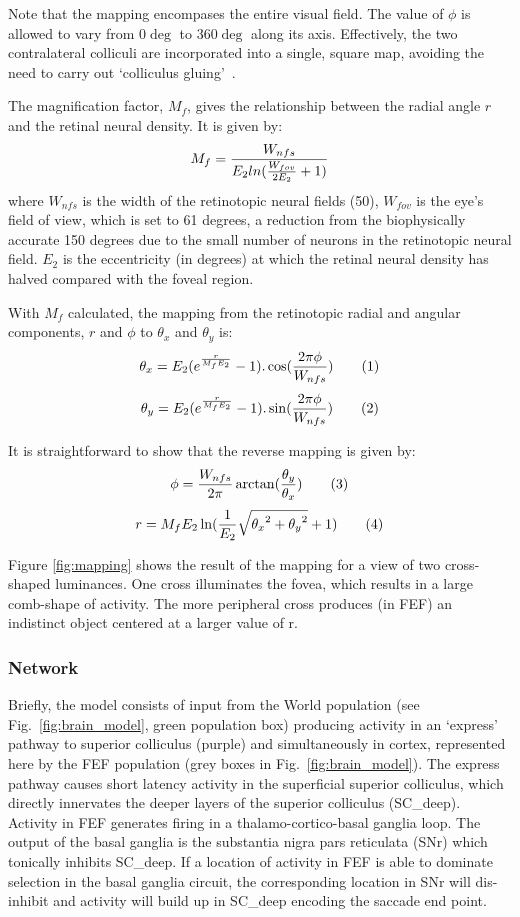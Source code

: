 \documentclass{frontiersSCNS}
\begin{document}
Note that the mapping encompases the entire visual field. The value of
$\phi$ is allowed to vary from 0$\deg$ to 360$\deg$ along its axis.
Effectively, the two contralateral colliculi are incorporated into a
single, square map, avoiding the need to carry out `colliculus
gluing'~\cite{tabareau_geometry_2007}.

The magnification factor, $M_f$, gives the relationship between the
radial angle $r$ and the retinal neural density. It is given by:
\[
   M_f = {W_{nfs} \over E_2 ln ({W_{fov} \over 2 E_2} + 1)}
\]
where $W_{nfs}$ is the width of the retinotopic neural fields (50),
$W_{fov}$ is the eye's field of view, which is set to 61 degrees, a
reduction from the biophysically accurate 150 degrees due to the small
number of neurons in the retinotopic neural field. $E_2$ is the
eccentricity (in degrees) at which the retinal neural density has
halved compared with the foveal region.

With $M_f$ calculated, the mapping from the retinotopic radial and
angular components, $r$ and $\phi$ to $\theta_x$ and $\theta_y$ is:
\[
   \theta_x = E_2 (e^{{r \over M_f E_2}} - 1).\cos({2 \pi \phi \over
   W_{nfs}}) \tag{1}
\]
\[
   \theta_y = E_2 (e^{{r \over M_f E_2}} - 1).\sin({2 \pi \phi \over W_{nfs}}) \tag{2}
\]

It is straightforward to show that the reverse mapping is given by:
\[
   \phi = {W_{nfs} \over 2 \pi}\arctan({\theta_y\over\theta_x}) \tag{3}
\]
\[
   r = M_f E_2 \ln ({1\over E_2}\sqrt{{\theta_x}^2 + {\theta_y}^2}+1) \tag{4}
\]

Figure \ref{fig:mapping} shows the result of the mapping for a view of
two cross-shaped luminances. One cross illuminates the fovea, which
results in a large comb-shape of activity. The more peripheral cross
produces (in FEF) an indistinct object centered at a larger value of
r.

\subsubsection{Network}

Briefly, the model consists of input from the World population (see
Fig.~\ref{fig:brain_model}, green population box) producing activity
in an `express' pathway to superior colliculus (purple) and
simultaneously in cortex, represented here by the FEF population (grey
boxes in Fig.~\ref{fig:brain_model}). The express pathway causes short
latency activity in the superficial superior colliculus, which
directly innervates the deeper layers of the superior colliculus
(SC\_deep). Activity in FEF generates firing in a
thalamo-cortico-basal ganglia loop. The output of the basal ganglia is
the substantia nigra pars reticulata (SNr) which tonically inhibits
SC\_deep. If a location of activity in FEF is able to dominate
selection in the basal ganglia circuit, the corresponding location in
SNr will dis-inhibit and activity will build up in SC\_deep encoding
the saccade end point.
\end{document}
